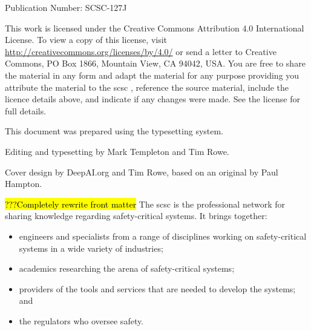 %
%

%
%

\pagestyle{FirstPageFrontCover}
%
%



 Publication Number: SCSC-127J

This work is licensed under the Creative Commons Attribution 4.0 International License. To view a copy of this license, visit \href{http://creativecommons.org/licenses/by/4.0/}{http://creativecommons.org/licenses/by/4.0/} or send a letter to Creative Commons, PO Box 1866, Mountain View, CA 94042, USA\@. You are free to share the material in any form and adapt the material for any purpose providing you attribute the material to the \gls{scsc} , reference the source material, include the licence details above, and indicate if any changes were made.  See the license for full details.

This document was prepared using the \LaTeXe\/ typesetting system.

Editing and typesetting by Mark Templeton and Tim Rowe.

Cover design by DeepAI.org and Tim Rowe, based on an original by Paul Hampton.


\clearpage
\pagestyle{ContinuationInsideFrontCover}
\hl{???Completely rewrite front matter}
The \gls{scsc} is the professional network for sharing knowledge regarding safety-critical systems. It brings together: 
\begin{itemize}
	\item engineers and specialists from a range of disciplines working on safety-critical systems in a wide variety of industries;
	\item academics researching the arena of safety-critical systems;
	\item providers of the tools and services that are needed to develop the systems; and
	\item the regulators who oversee safety.
\end{itemize}

